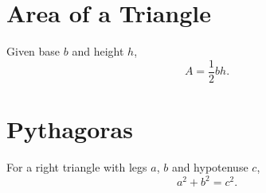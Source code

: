 \documentclass[12pt,a4paper]{article}
\begin{document}
\section*{Area of a Triangle}
Given base $b$ and height $h$,
\[
  A = \frac{1}{2} b h.
\]

\section*{Pythagoras}
For a right triangle with legs $a$, $b$ and hypotenuse $c$,
\[
  a^2 + b^2 = c^2.
\]
\end{document}
